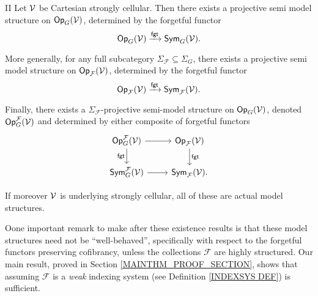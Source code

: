 \documentclass[a4paper,10pt]{article}%
\begin{document}
\begin{customthm}{II}\label{MAINEXIST2 THM}
Let $\mathcal V$ be Cartesian strongly cellular.
Then there exists a projective semi model structure on $\mathsf{Op}_{G}(\mathcal V)$, determined by the forgetful functor
\[
\mathsf{Op}_G(\mathcal V) \xrightarrow{\mathsf{fgt}} \mathsf{Sym}_G(\mathcal V).
\]

More generally, for any full subcategory $\Sigma_{\mathcal F} \subseteq \Sigma_G$, 
there exists a projective semi model structure on $\mathsf{Op}_{\mathcal F}(\mathcal V)$, determined by the forgetful functor
\[
\mathsf{Op}_{\mathcal F}(\mathcal V) \xrightarrow{\mathsf{fgt}} \mathsf{Sym}_{\mathcal F}(\mathcal V).
\]

Finally, 
there exists a $\Sigma_{\mathcal F}$-projective semi-model structure on $\mathsf{Op}_G(\mathcal V)$, denoted $\mathsf{Op}_G^{\mathcal F}(\mathcal V)$ and determined by either composite of forgetful functors
\[
\begin{tikzcd}
  \Op_G^{\mathcal F}(\V) \arrow[d, "\mathsf{fgt}"'] \arrow[r] & \Op_{\mathcal F}(\V) \arrow[d, "\mathsf{fgt}"]\\
  \Sym_G^{\mathcal F}(\V) \arrow[r] & \Sym_{\mathcal F}(\V).
\end{tikzcd}
\]  


If moreover $\mathcal V$ is underlying strongly cellular, all of these are actual model structures.
\end{customthm}

Oone important remark to make after these existence results is that these model structures need not be ``well-behaved'', specifically with respect to the forgetful functors preserving cofibrancy, unless the collections ${\mathcal F}$ are highly structured.
Our main result, proved in Section \ref{MAINTHM_PROOF_SECTION}, shows that assuming $\mathcal F$ is a \textit{weak} indexing system (see Definition \ref{INDEXSYS DEF}) is sufficient.
\end{document}
